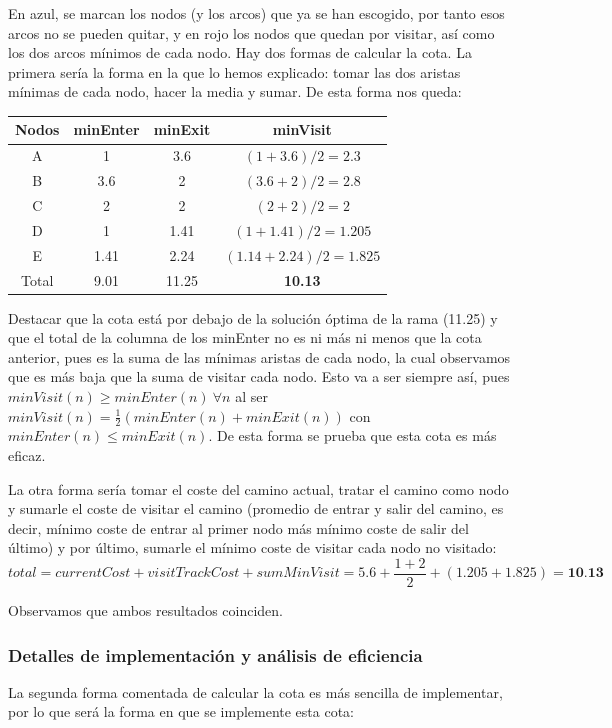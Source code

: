 \documentclass{article}
\begin{document}
En azul, se marcan los nodos (y los arcos) que ya se han escogido, por tanto esos arcos no se pueden quitar, y en rojo los nodos que quedan por visitar, así como los dos arcos mínimos de cada nodo. 
Hay dos formas de calcular la cota. La primera sería la forma en la que lo hemos explicado: tomar las dos aristas mínimas de cada nodo, hacer la media y sumar. De esta forma nos queda:
\begin{table}[!hbt]
    \centering
    \begin{tabular}{|c|c|c|c|}
            \hline
        Nodos & minEnter & minExit & minVisit \\
        \hline
        A & 1 & 3.6 & $(1+3.6)/2=2.3$ \\
        B & 3.6 & 2 & $(3.6+2)/2=2.8$ \\
        C & 2 & 2 & $(2+2)/2=2$ \\
        D & 1 & 1.41 & $(1+1.41)/2=1.205$ \\
        E & 1.41 & 2.24 & $(1.14+2.24)/2=1.825$ \\
        \hline
        Total & 9.01 & 11.25 & \textbf{10.13} \\
        \hline
    \end{tabular}
\end{table}

Destacar que la cota está por debajo de la solución óptima de la rama (11.25) y que el total de la columna de los minEnter no es ni más ni menos que la cota anterior, pues es la suma de las mínimas aristas de cada nodo, la cual observamos que es más baja que la suma de visitar cada nodo. Esto va a ser siempre así, pues $minVisit(n) \geq minEnter(n) \ \forall n$ al ser $minVisit(n) = \frac{1}{2}(minEnter(n) + minExit(n))$ con $minEnter(n) \leq minExit(n)$. De esta forma se prueba que esta cota es más eficaz. 

La otra forma sería tomar el coste del camino actual, tratar el camino como nodo y sumarle el coste de visitar el camino (promedio de entrar y salir del camino, es decir, mínimo coste de entrar al primer nodo más mínimo coste de salir del último) y por último, sumarle el mínimo coste de visitar cada nodo no visitado:
\[
    total = currentCost + visitTrackCost + sumMinVisit = 5.6 + \frac{1+2}{2} + (1.205+1.825) = \textbf{10.13}
\]

Observamos que ambos resultados coinciden. 

\subsubsection{Detalles de implementación y análisis de eficiencia} \label{subsubsec:ef_fcota3}
La segunda forma comentada de calcular la cota es más sencilla de implementar, por lo que será la forma en que se implemente esta cota:
\end{document}
